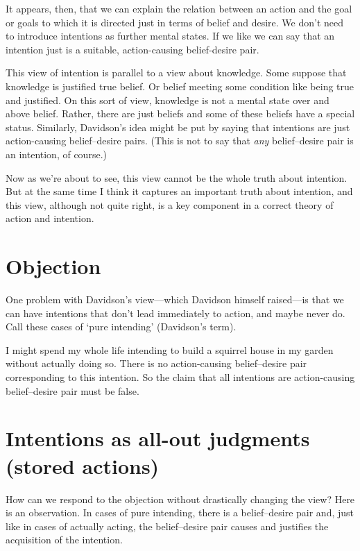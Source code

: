 \documentclass[12pt,\papersize]{extarticle}
\begin{document}
It appears, then, that we can explain the relation between an action and the goal or goals to which it is directed just in terms of belief and desire.
We don't need to introduce intentions as further mental states.
If we like we can say that an intention just is a suitable, action-causing belief-desire pair.

This view of intention is parallel to a view about knowledge.
Some suppose that knowledge is justified true belief.  
Or belief meeting some condition like being true and justified.
On this sort of view, knowledge is not a mental state over and above belief.
Rather, there are just beliefs and some of these beliefs have a special status.
Similarly, Davidson's idea might be put by saying that intentions are just action-causing belief--desire pairs.
(This is not to say that \emph{any} belief--desire pair is an intention, of course.)

Now as we're about to see, this view cannot be the whole truth about intention.
But at the same time I think it captures an important truth about intention,
and this view, although not quite right, is a key component in a correct theory of action and intention.


\section{Objection}
One problem with Davidson's view---which Davidson himself raised---is that we can have intentions that don't lead immediately to action, and maybe never do.
Call these cases of `pure intending' (Davidson's term).

I might spend my whole life intending to build a squirrel house in my garden without actually doing so.
There is no action-causing belief--desire pair corresponding to this intention.
So the claim that all intentions are action-causing belief--desire pair must be false.


\section{Intentions as all-out judgments (stored actions)}
How can we respond to the objection without drastically changing the view?
Here is an observation.
In cases of pure intending, there is a belief--desire pair and, just like in cases of actually acting, the belief--desire pair causes and justifies the acquisition of the intention.
\end{document}
